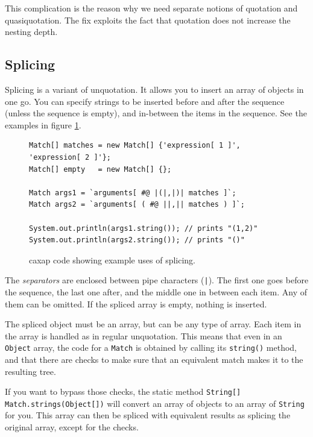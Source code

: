 This complication is the reason why we need separate notions of quotation and
quasiquotation. The fix exploits the fact that quotation does not increase the
nesting depth.

\subsection{Splicing}
\label{splicing}

Splicing is a variant of unquotation. It allows you to insert an array of
objects in one go. You can specify strings to be inserted before and after the
sequence (unless the sequence is empty), and in-between the items in the
sequence. See the examples in figure \ref{splicing_example}.

\begin{figure}[here]
\small
\begin{lstlisting}[frame=single,language=caxap]
Match[] matches = new Match[] {'expression[ 1 ]', 'expression[ 2 ]'};
Match[] empty   = new Match[] {};

Match args1 = `arguments[ #@ |(|,|)| matches ]`;
Match args2 = `arguments[ ( #@ ||,|| matches ) ]`;

System.out.println(args1.string()); // prints "(1,2)"
System.out.println(args2.string()); // prints "()"
\end{lstlisting}
\caption{caxap code showing example uses of splicing.}
\label{splicing_example}
\end{figure}

The \emph{separators} are enclosed between pipe characters (\texttt{|}). The
first one goes before the sequence, the last one after, and the middle one in
between each item. Any of them can be omitted. If the spliced array is empty,
nothing is inserted.

The spliced object must be an array, but can be any type of array. Each item in
the array is handled as in regular unquotation. This means that even in an
\texttt{Object} array, the code for a \texttt{Match} is obtained by calling its
\texttt{string()} method, and that there are checks to make sure that an
equivalent match makes it to the resulting tree.

If you want to bypass those checks, the static method \texttt{String[]
  Match.strings(Object[])} will convert an array of objects to an array of
\texttt{String} for you. This array can then be spliced with equivalent results
as splicing the original array, except for the checks.


